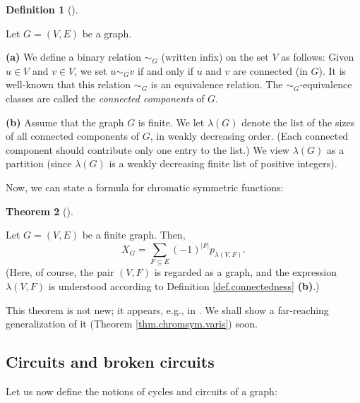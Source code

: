\documentclass[numbers=enddot,12pt,final,onecolumn,notitlepage]{scrartcl}%
\theoremstyle{definition}
\newtheorem{theo}{Theorem}[section]
\newenvironment{theorem}[1][]
{\begin{theo}[#1]\begin{leftbar}}
{\end{leftbar}\end{theo}}
\newtheorem{defi}[theo]{Definition}
\newenvironment{definition}[1][]
{\begin{defi}[#1]\begin{leftbar}}
{\end{leftbar}\end{defi}}
\let\sumnonlimits\sum
\renewcommand{\sum}{\sumnonlimits\limits}
\begin{document}
\begin{definition}
\label{def.connectedness}Let $G=\left(  V,E\right)  $ be a graph.

\textbf{(a)} We define a binary relation $\sim_{G}$ (written infix) on the set
$V$ as follows: Given $u\in V$ and $v\in V$, we set $u\sim_{G}v$ if and only
if $u$ and $v$ are connected (in $G$). It is well-known that this relation
$\sim_{G}$ is an equivalence relation. The $\sim_{G}$-equivalence classes are
called the \emph{connected components} of $G$.

\textbf{(b)} Assume that the graph $G$ is finite. We let $\lambda\left(
G\right)  $ denote the list of the sizes of all connected components of $G$,
in weakly decreasing order. (Each connected component should contribute only
one entry to the list.) We view $\lambda\left(  G\right)  $ as a partition
(since $\lambda\left(  G\right)  $ is a weakly decreasing finite list of
positive integers).
\end{definition}

Now, we can state a formula for chromatic symmetric functions:

\begin{theorem}
\label{thm.chromsym.empty}Let $G=\left(  V,E\right)  $ be a finite graph.
Then,%
\[
X_{G}=\sum_{F\subseteq E}\left(  -1\right)  ^{\left\vert F\right\vert
}p_{\lambda\left(  V,F\right)  }.
\]
(Here, of course, the pair $\left(  V,F\right)  $ is regarded as a graph, and
the expression $\lambda\left(  V,F\right)  $ is understood according to
Definition \ref{def.connectedness} \textbf{(b)}.)
\end{theorem}

This theorem is not new; it appears, e.g., in \cite[Theorem 2.5]%
{Stanley-chsym}. We shall show a far-reaching generalization of it (Theorem
\ref{thm.chromsym.varis}) soon.

\subsection{Circuits and broken circuits}

Let us now define the notions of cycles and circuits of a graph:
\end{document}
